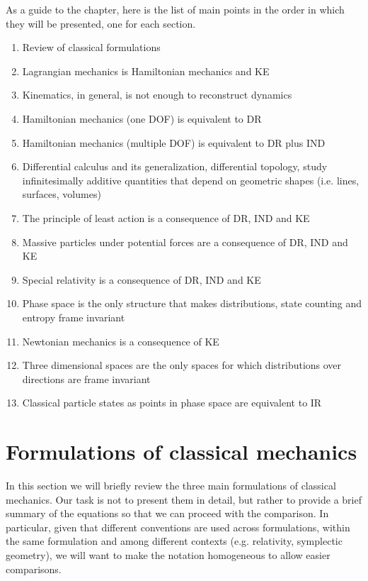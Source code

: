 As a guide to the chapter, here is the list of main points in the order in which they will be presented, one for each section.
\begin{enumerate}
	\item Review of classical formulations
	\item Lagrangian mechanics is Hamiltonian mechanics and KE
	\item Kinematics, in general, is not enough to reconstruct dynamics
	\item Hamiltonian mechanics (one DOF) is equivalent to DR
	\item Hamiltonian mechanics (multiple DOF) is equivalent to DR plus IND
	\item Differential calculus and its generalization, differential topology, study infinitesimally additive quantities that depend on geometric shapes (i.e. lines, surfaces, volumes)
	\item The principle of least action is a consequence of DR, IND and KE
	\item Massive particles under potential forces are a consequence of DR, IND and KE
	\item Special relativity is a consequence of DR, IND and KE
	\item Phase space is the only structure that makes distributions, state counting and entropy frame invariant
	\item Newtonian mechanics is a consequence of KE
	\item Three dimensional spaces are the only spaces for which distributions over directions are frame invariant
	\item Classical particle states as points in phase space are equivalent to IR
\end{enumerate}

\section{Formulations of classical mechanics}

In this section we will briefly review the three main formulations of classical mechanics. Our task is not to present them in detail, but rather to provide a brief summary of the equations so that we can proceed with the comparison. In particular, given that different conventions are used across formulations, within the same formulation and among different contexts (e.g. relativity, symplectic geometry), we will want to make the notation homogeneous to allow easier comparisons.

